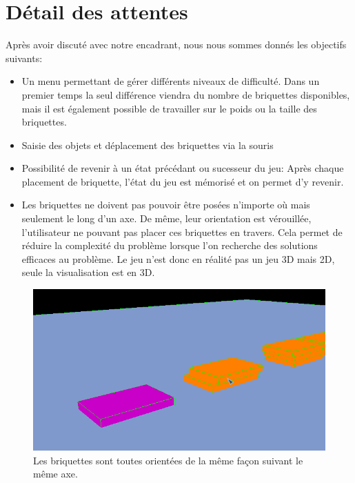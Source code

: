 \documentclass[frenchb,twoside]{EPURapport}
\begin{document}
\section{Détail des attentes}
    Après avoir discuté avec notre encadrant, nous nous sommes donnés les objectifs suivants:
    \begin{itemize}
        \item Un menu permettant de gérer différents niveaux de difficulté.
        Dans un premier temps la seul différence viendra du nombre de
        briquettes disponibles, mais il est également possible de travailler
        sur le poids ou la taille des briquettes.
        \item Saisie des objets et déplacement des briquettes via la souris
        \item Possibilité de revenir à un état précédant ou sucesseur du jeu:
        Après chaque placement de briquette, l'état du jeu est mémorisé et on
        permet d'y revenir.
        \item Les briquettes ne doivent pas pouvoir être posées n'importe où
        mais seulement le long d'un axe. De même, leur orientation est
        vérouillée, l'utilisateur ne pouvant pas placer ces briquettes en
        travers. Cela permet de réduire la complexité du problème lorsque l'on
        recherche des solutions efficaces au problème.
        Le jeu n'est donc en réalité pas un jeu 3D mais 2D, seule la visualisation est en 3D.
        
    \end{itemize}
     \begin{figure}[h]
		\centering
        \includegraphics[width=16cm]{images/zoom_briquette.png}
        \caption{\label{fig:zoom_briquette}Les briquettes sont toutes orientées
        de la même façon suivant le même axe.}
    \end{figure}
\end{document}
